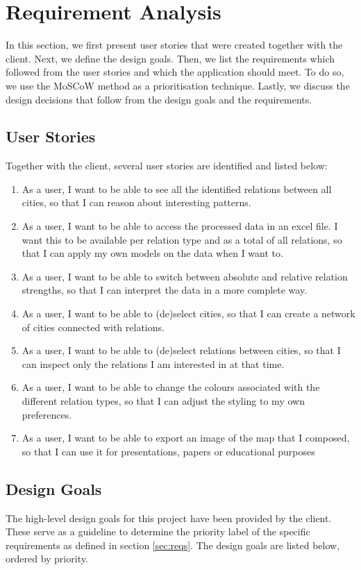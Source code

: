 \section {Requirement Analysis}\label{sec:reqs-analysis}
In this section, we first present user stories that were created together with the client. Next, we define the design goals. Then, we list the requirements which followed from the user stories and which the application should meet. To do so, we use the MoSCoW method\cite{clegg1994case} as a prioritisation technique. Lastly, we discuss the design decisions that follow from the design goals and the requirements.

\subsection{User Stories}
Together with the client, several user stories are identified and listed below:
\begin{enumerate}
    \item As a user, I want to be able to see all the identified relations between all cities, so that I can reason about interesting patterns.
    \item As a user, I want to be able to access the processed data in an excel file. I want this to be available per relation type and as a total of all relations, so that I can apply my own models on the data when I want to.
    \item As a user, I want to be able to switch between absolute and relative relation strengths, so that I can interpret the data in a more complete way.
    \item As a user, I want to be able to (de)select cities, so that I can create a network of cities connected with relations.
    \item As a user, I want to be able to (de)select relations between cities, so that I can inspect only the relations I am interested in at that time.
    \item As a user, I want to be able to change the colours associated with the different relation types, so that I can adjust the styling to my own preferences.
    \item As a user, I want to be able to export an image of the map that I composed, so that I can use it for presentations, papers or educational purposes
\end{enumerate}

\subsection{Design Goals} \label{sec:design-goals}
The high-level design goals for this project have been provided by the client. These serve as a guideline to determine the priority label of the specific requirements as defined in section \ref{sec:reqs}. The design goals are listed below, ordered by priority.

